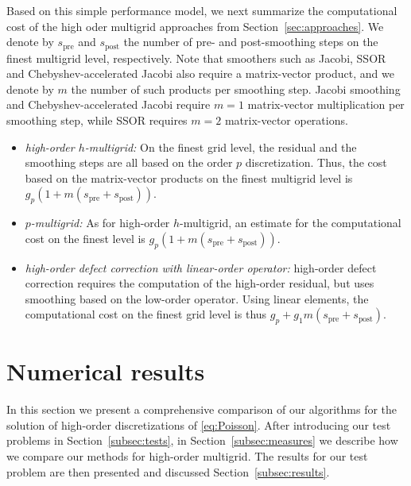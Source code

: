 \documentclass[smallcondensed,final]{svjour3}     %
\begin{document}
Based on this simple performance model, we next summarize the
computational cost of the high oder multigrid approaches from
Section~\ref{sec:approaches}. We denote by $s_\text{pre}$ and
$s_\text{post}$ the number of pre- and post-smoothing steps on the
finest multigrid level, respectively. Note that smoothers such as
Jacobi, SSOR and Chebyshev-accelerated Jacobi also require a
matrix-vector product, and we denote by $m$ the number of such
products per smoothing step.  Jacobi smoothing and
Chebyshev-accelerated Jacobi require $m=1$ matrix-vector
multiplication per smoothing step, while SSOR requires $m=2$
matrix-vector operations.

\begin{itemize}
\item {\em high-order $h$-multigrid:} On the finest grid level, the
  residual and the smoothing steps are all based on the order $p$
  discretization. Thus, the cost based on the matrix-vector products
  on the finest multigrid level is
  $g_p(1+m(s_\text{pre}+s_\text{post}))$.

\item {\em $p$-multigrid:} As for high-order $h$-multigrid, an
  estimate for the computational cost on the finest level is
  $g_p(1+m(s_\text{pre}+s_\text{post}))$.

\item {\em high-order defect correction with linear-order operator:}
  high-order defect correction requires the computation of the
  high-order residual, but uses smoothing based on the low-order
  operator. Using linear elements, the computational cost on the
  finest grid level is thus
  $g_p+g_1m(s_\text{pre}+s_\text{post})$.
\end{itemize}


\section{Numerical results}\label{sec:numerics}
In this section we present a comprehensive comparison of our
algorithms for the solution of high-order discretizations of
\eqref{eq:Poisson}.  After introducing our test problems in
Section~\ref{subsec:tests}, in Section~\ref{subsec:measures} we
describe how we compare our methods for high-order multigrid. The
results for our test problem are then presented and discussed
Section~\ref{subsec:results}.
\end{document}
